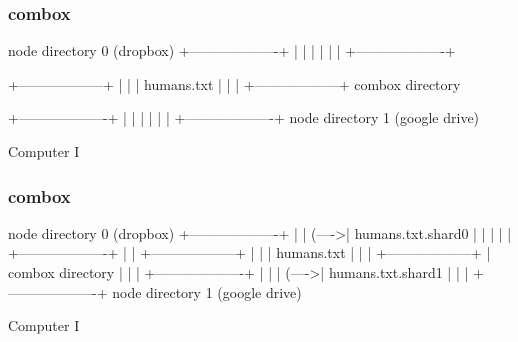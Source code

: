 \begin{frame}[fragile]
  \frametitle{combox}

  {\tiny
  \begin{semiverbatim}

         node directory 0
         (dropbox)
        +-------------------+
        |                   |
        |                   |
        |                   |
        +-------------------+


 +------------------+
 |                  |
 |  humans.txt      |
 |                  |
 +------------------+
     combox directory


        +-------------------+
        |                   |
        |                   |
        |                   |
        +-------------------+
         node directory 1
         (google drive)

  Computer I
  \end{semiverbatim}
  }

\end{frame}


\begin{frame}[fragile]
  \frametitle{combox}

  {\tiny
  \begin{semiverbatim}

         node directory 0
         (dropbox)
        +-------------------+
        |                   |
  (---->| humans.txt.shard0 |
  |     |                   |
  |     +-------------------+
  |
  |
 +------------------+
 |                  |
 |  humans.txt      |
 |                  |
 +------------------+
  |  combox directory
  |
  |
  |     +-------------------+
  |     |                   |
  (---->| humans.txt.shard1 |
        |                   |
        +-------------------+
         node directory 1
         (google drive)

  Computer I
  \end{semiverbatim}
  }

\end{frame}


